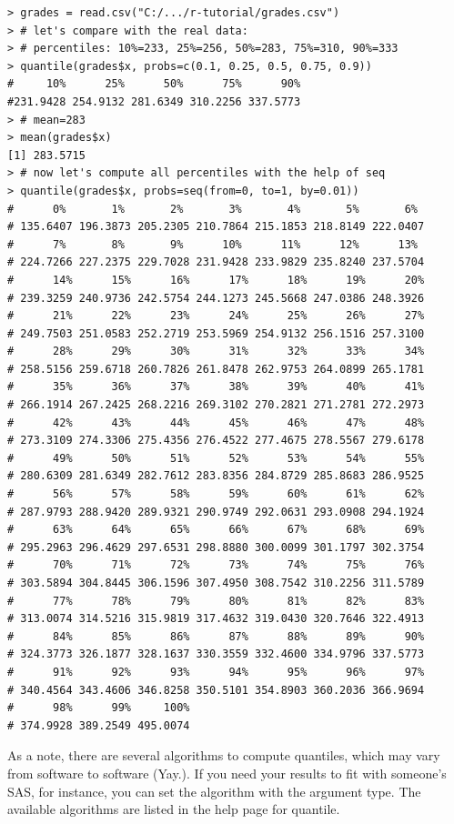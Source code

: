 \documentclass{report}
\newcommand{\code}[1]{\textsf{\ttfamily #1}}
\begin{document}
		\begin{verbatim}
> grades = read.csv("C:/.../r-tutorial/grades.csv")
> # let's compare with the real data: 
> # percentiles: 10%=233, 25%=256, 50%=283, 75%=310, 90%=333
> quantile(grades$x, probs=c(0.1, 0.25, 0.5, 0.75, 0.9))
#     10%      25%      50%      75%      90% 
#231.9428 254.9132 281.6349 310.2256 337.5773 
> # mean=283
> mean(grades$x)
[1] 283.5715
> # now let's compute all percentiles with the help of seq
> quantile(grades$x, probs=seq(from=0, to=1, by=0.01))
#      0%       1%       2%       3%       4%       5%       6% 
# 135.6407 196.3873 205.2305 210.7864 215.1853 218.8149 222.0407 
#      7%       8%       9%      10%      11%      12%      13% 
# 224.7266 227.2375 229.7028 231.9428 233.9829 235.8240 237.5704 
#      14%      15%      16%      17%      18%      19%      20% 
# 239.3259 240.9736 242.5754 244.1273 245.5668 247.0386 248.3926 
#      21%      22%      23%      24%      25%      26%      27% 
# 249.7503 251.0583 252.2719 253.5969 254.9132 256.1516 257.3100 
#      28%      29%      30%      31%      32%      33%      34% 
# 258.5156 259.6718 260.7826 261.8478 262.9753 264.0899 265.1781 
#      35%      36%      37%      38%      39%      40%      41% 
# 266.1914 267.2425 268.2216 269.3102 270.2821 271.2781 272.2973 
#      42%      43%      44%      45%      46%      47%      48% 
# 273.3109 274.3306 275.4356 276.4522 277.4675 278.5567 279.6178 
#      49%      50%      51%      52%      53%      54%      55% 
# 280.6309 281.6349 282.7612 283.8356 284.8729 285.8683 286.9525 
#      56%      57%      58%      59%      60%      61%      62% 
# 287.9793 288.9420 289.9321 290.9749 292.0631 293.0908 294.1924 
#      63%      64%      65%      66%      67%      68%      69% 
# 295.2963 296.4629 297.6531 298.8880 300.0099 301.1797 302.3754 
#      70%      71%      72%      73%      74%      75%      76% 
# 303.5894 304.8445 306.1596 307.4950 308.7542 310.2256 311.5789 
#      77%      78%      79%      80%      81%      82%      83% 
# 313.0074 314.5216 315.9819 317.4632 319.0430 320.7646 322.4913 
#      84%      85%      86%      87%      88%      89%      90% 
# 324.3773 326.1877 328.1637 330.3559 332.4600 334.9796 337.5773 
#      91%      92%      93%      94%      95%      96%      97% 
# 340.4564 343.4606 346.8258 350.5101 354.8903 360.2036 366.9694 
#      98%      99%     100% 
# 374.9928 389.2549 495.0074 
		\end{verbatim}
		
		As a note, there are several algorithms to compute quantiles, which may vary from software to software (Yay.). If you need your results to fit with someone's SAS, for instance, you can set the algorithm with the argument \code{type}. The available algorithms are listed in the help page for \code{quantile}.
		
\end{document}
